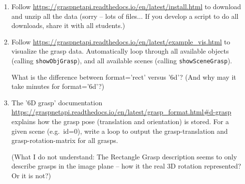 \begin{enumerate}
\item
Follow {\urlfont\url{https://graspnetapi.readthedocs.io/en/latest/install.html}}
to download and unzip all the data (sorry -- lots of files... If you
develop a script to do all downloads, share it with all students.)

\item
Follow {\urlfont\url{https://graspnetapi.readthedocs.io/en/latest/example_vis.html}}
to visualize the grasp data. Automatically loop through all available
objects (calling \texttt{showObjGrasp}), and all available scenes
(calling \texttt{showSceneGrasp}).

What is the difference between format='rect' versus '6d'? (And why may
it take minutes for format='6d'?)

\item The '6D grasp' documentation
{\urlfont\url{https://graspnetapi.readthedocs.io/en/latest/grasp_format.html#d-grasp}}
explains how the grasp pose (translation and orientation) is
stored. For a given scene (e.g.\ id=0), write a loop to output the
grasp-translation and grasp-rotation-matrix for all grasps.

(What I do not understand: The Rectangle Grasp description seems to
only describe grasps in the image plane -- how it the real 3D rotation
represented? Or it is not?)

\end{enumerate}


\ifthenelse{\isundefined{\scripthead}}{


}{}


\exerfoot
